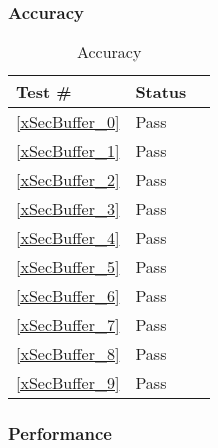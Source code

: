 \documentclass[12pt]{article}
\begin{document}
	\subsubsection{Accuracy}
		\begin{table}[H]
		\centering
		\caption{Accuracy}\label{xSecBuffer_acc}
		\begin{tabular}{lll}
		\toprule
		\bf Test \# & Status \\\midrule
		\ref{xSecBuffer_0} & Pass\\
		\ref{xSecBuffer_1} & Pass\\
		\ref{xSecBuffer_2} & Pass\\
		\ref{xSecBuffer_3} & Pass\\
		\ref{xSecBuffer_4} & Pass\\
		\ref{xSecBuffer_5} & Pass\\
		\ref{xSecBuffer_6} & Pass\\
		\ref{xSecBuffer_7} & Pass\\
		\ref{xSecBuffer_8} & Pass\\
		\ref{xSecBuffer_9} & Pass\\
		\bottomrule
		\end{tabular}
		\end{table}
	\subsubsection{Performance}
\end{document}
